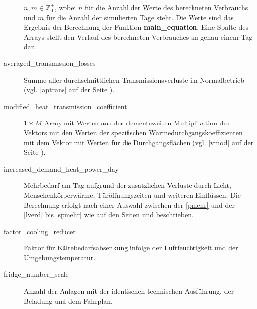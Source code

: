 \begin{description}
	$n,m\in \mathbb{Z}^+_0$, wobei $n$ f\"ur die Anzahl der Werte des
	berechneten Verbrauchs und $m$ f\"ur die Anzahl der simulierten Tage
	steht. Die Werte sind das Ergebnis der Berechnung der Funktion
	\textbf{main\_equation}. Eine Spalte des Arrays stellt den Verlauf des
	berechneten Verbrauches an genau einem Tag dar.
	\item[averaged\_transmission\_losses] Summe aller durchschnittlichen
	Transmissionsverluste im Normalbetrieb (vgl. \cref{aptrans} auf der
	Seite \pageref{aptrans}).
	\item[modified\_heat\_transmission\_coefficient] $1\times M$-Array mit
	Werten aus der elementeweisen Multiplikation des Vektors mit den Werten
	der spezifischen W\"armedurchgangskoeffizienten mit dem Vektor mit
	Werten f\"ur die Durchgangsfl\"achen (vgl.  \cref{vmod} auf der Seite
	\pageref{vmod}).
	\item[increased\_demand\_heat\_power\_day] Mehrbedarf am Tag aufgrund
	der zus\"atzlichen Verluste durch Licht, Menschenk\"orperw\"arme,
	T\"ur\"offnungszeiten und weiteren Einfl\"ussen. Die Berechnung erfolgt
	nach einer Auswahl zwischen der \cref{pmehr} und der \cref{lverd} bis
	\cref{spmehr} wie auf den Seiten \pageref{pmehr} und \pageref{spmehr}
	beschrieben.
	\item[factor\_cooling\_reducer] Faktor f\"ur K\"altebedarfsabsenkung
	infolge der Luftfeuchtigkeit und der Umgebungstemperatur.
	\item[fridge\_number\_scale] Anzahl der Anlagen mit der identischen
	technischen Ausf\"uhrung, der Beladung und dem Fahrplan.
\end{description}

